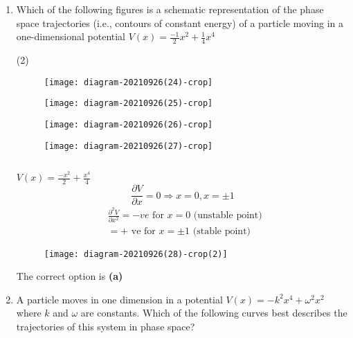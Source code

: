 \begin{enumerate}
	\item Which of the following figures is a schematic representation of the phase space trajectories (i.e., contours of constant energy) of a particle moving in a one-dimensional potential $V(x)=\frac{-1}{2} x^{2}+\frac{1}{4} x^{4}$
	{}
\begin{tasks}(2)
	\task[\textbf{A.}]\begin{figure}[H]
		\centering
		\texttt{[image: diagram-20210926(24)-crop]}
	\end{figure}
	\task[\textbf{B.}]\begin{figure}[H]
		\centering
		\texttt{[image: diagram-20210926(25)-crop]}
	\end{figure}
	\task[\textbf{C.}]\begin{figure}[H]
		\centering
		\texttt{[image: diagram-20210926(26)-crop]}
	\end{figure}
	\task[\textbf{D.}]\begin{figure}[H]
		\centering
		\texttt{[image: diagram-20210926(27)-crop]}
	\end{figure}
\end{tasks}
\begin{answer}$\left. \right. $\\
	\begin{minipage}{0.5\textwidth}
	$V(x)=\frac{-x^{2}}{2}+\frac{x^{4}}{4}$
	$$
	\frac{\partial V}{\partial x}=0 \Rightarrow x=0, x=\pm 1
	$$
	$$
	\begin{aligned}
	&\frac{\partial^{2} V}{\partial x^{2}}=-v e \text { for } x=0 \text { (unstable point) } \\
	&=+\text { ve for } x=\pm 1 \text { (stable point) }
	\end{aligned}
	$$
	\end{minipage}
	\begin{minipage}{0.5\textwidth}
	\begin{figure}[H]
		\centering
		\texttt{[image: diagram-20210926(28)-crop(2)]}
		\caption{}
		\label{}
	\end{figure}
	\end{minipage}
The correct option is \textbf{(a)}
\end{answer}
	\item A particle moves in one dimension in a potential $V(x)=-k^{2} x^{4}+\omega^{2} x^{2}$ where $k$ and $\omega$ are constants. Which of the following curves best describes the trajectories of this system in phase space?

\end{enumerate}
